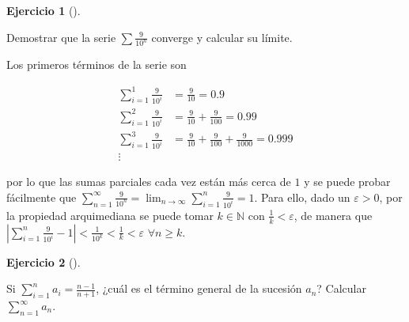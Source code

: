 \documentclass[
  a4paper,
]{scrreport}
\theoremstyle{definition}
\newtheorem{exercise}{Ejercicio}[chapter]
\theoremstyle{remark}
\begin{document}
\begin{exercise}[]\protect\hypertarget{exr-números-decimales-series}{}\label{exr-números-decimales-series}

Demostrar que la serie \(\sum \frac{9}{10^n}\) converge y calcular su
límite.

\end{exercise}

\begin{tcolorbox}[enhanced jigsaw, left=2mm, coltitle=black, colbacktitle=quarto-callout-tip-color!10!white, opacitybacktitle=0.6, colback=white, breakable, titlerule=0mm, toptitle=1mm, rightrule=.15mm, bottomtitle=1mm, bottomrule=.15mm, toprule=.15mm, leftrule=.75mm, arc=.35mm, opacityback=0, title=\textcolor{quarto-callout-tip-color}{\faLightbulb}\hspace{0.5em}{Solución}, colframe=quarto-callout-tip-color-frame]

Los primeros términos de la serie son

\begin{align*}
\sum_{i=1}^1 \frac{9}{10^i} &= \frac{9}{10} = 0.9\\ 
\sum_{i=1}^2 \frac{9}{10^i} &= \frac{9}{10} + \frac{9}{100} = 0.99\\ 
\sum_{i=1}^3 \frac{9}{10^i} &= \frac{9}{10} + \frac{9}{100} + \frac{9}{1000} = 0.999\\ 
\vdots
\end{align*}

por lo que las sumas parciales cada vez están más cerca de \(1\) y se
puede probar fácilmente que
\(\sum_{n=1}^\infty \frac{9}{10^n} = \lim_{n\to\infty} \sum_{i=1}^n \frac{9}{10^i} = 1\).
Para ello, dado un \(\varepsilon>0\), por la propiedad arquimediana se
puede tomar \(k\in\mathbb{N}\) con \(\frac{1}{k}<\varepsilon\), de
manera que
\(|\sum_{i=1}^n \frac{9}{10^i} -1|<\frac{1}{10^k}<\frac{1}{k}<\varepsilon\)
\(\forall n\geq k\).

\end{tcolorbox}

\begin{exercise}[]\protect\hypertarget{exr-sumas-parciales}{}\label{exr-sumas-parciales}

Si \(\sum_{i=1}^n a_i=\frac{n-1}{n+1}\), ¿cuál es el término general de
la sucesión \(a_n\)? Calcular \(\sum_{n=1}^\infty a_n\).

\end{exercise}
\end{document}
